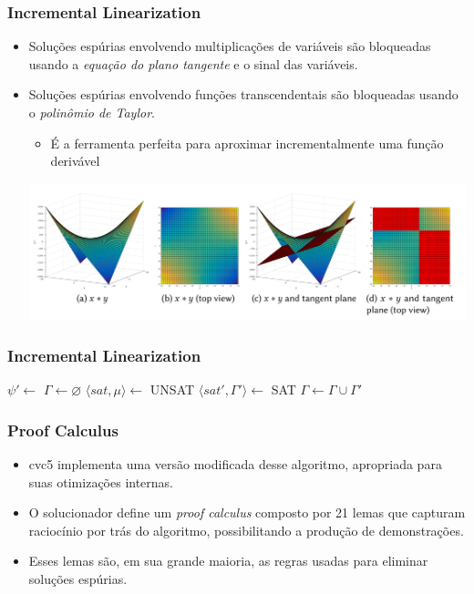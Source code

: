 \documentclass[usepdftitle=false,aspectratio=169,usenames,dvipsnames]{beamer}
\newcommand\vitem{\vfill\item}
\begin{document}
\begin{frame}
  \frametitle{Incremental Linearization}
  \begin{itemize}
  \item Soluções espúrias envolvendo multiplicações de variáveis são bloqueadas usando a \textit{equação do plano tangente} e o sinal das variáveis.

  \vitem Soluções espúrias envolvendo funções transcendentais são bloqueadas usando o \textit{polinômio de Taylor}.
          \begin{itemize}
                  \item É a ferramenta perfeita para aproximar incrementalmente uma função derivável
          \end{itemize}

  \centering
  \includegraphics[scale=0.1]{images/tanPlane.png}
  \end{itemize}
\end{frame}

\begin{frame}
  \frametitle{Incremental Linearization}
  \begin{algorithmic}[1]
      \State $\psi' \gets$ 
      \State $\Gamma \gets \varnothing$
        \State $\langle sat, \mu \rangle \gets $
          \Return UNSAT
        \EndIf
        \State $\langle sat', \Gamma' \rangle \gets $
          \Return SAT
        \EndIf
        \State $\Gamma \gets \Gamma \cup \Gamma'$
      \EndWhile
    \EndFunction
  \end{algorithmic}
\end{frame}

\begin{frame}
  \frametitle{Proof Calculus}
  \begin{itemize}
    \item cvc5 implementa uma versão modificada desse algoritmo, apropriada para suas otimizações internas.
    \vitem O solucionador define um \textit{proof calculus} composto por 21 lemas que capturam raciocínio por trás do algoritmo, possibilitando a produção de demonstrações.
    \vitem Esses lemas são, em sua grande maioria, as regras usadas para eliminar soluções espúrias.
  \end{itemize}
\end{frame}
\end{document}
